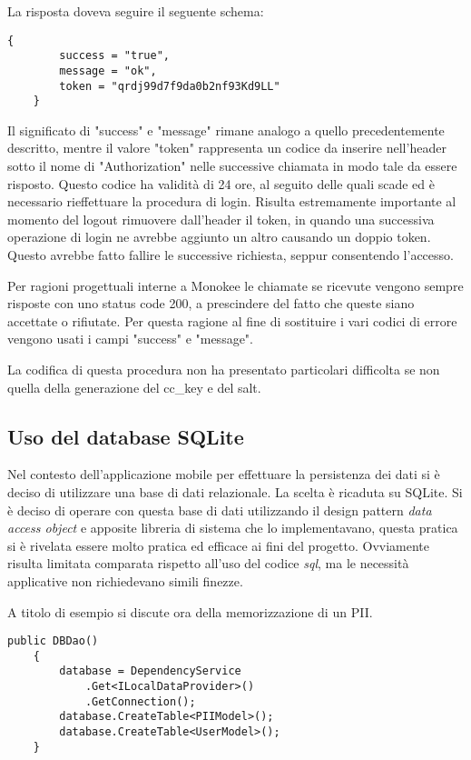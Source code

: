 La risposta doveva seguire il seguente schema:
\begin{lstlisting}[caption={Json risposta token}]
    {
        success = "true",
        message = "ok",
        token = "qrdj99d7f9da0b2nf93Kd9LL"
    }
\end{lstlisting}

Il significato di "success" e "message" rimane analogo a quello precedentemente descritto, mentre il valore "token" rappresenta un codice da inserire nell'header sotto il nome di "Authorization" nelle successive chiamata in modo tale da essere risposto. Questo codice ha validità di 24 ore, al seguito delle quali scade ed è necessario rieffettuare la procedura di login. Risulta estremamente importante al momento del logout rimuovere dall'header il token, in quando una successiva operazione di login ne avrebbe aggiunto un altro causando un doppio token. Questo avrebbe fatto fallire le successive richiesta, seppur consentendo l'accesso.

Per ragioni progettuali interne a Monokee le chiamate se ricevute vengono sempre risposte con uno status code 200, a prescindere del fatto che queste siano accettate o rifiutate. Per questa ragione al fine di sostituire i vari codici di errore vengono usati i campi "success" e "message". 

La codifica di questa procedura non ha presentato particolari difficolta se non quella della generazione del cc\_key e del salt. 

\subsection{Uso del database SQLite}

Nel contesto dell'applicazione mobile per effettuare la persistenza dei dati si è deciso di utilizzare una base di dati relazionale. La scelta è ricaduta su SQLite. Si è deciso di operare con questa base di dati utilizzando il design pattern \emph{data access object} e apposite libreria di sistema che lo implementavano, questa pratica si è rivelata essere molto pratica ed efficace ai fini del progetto. Ovviamente risulta limitata comparata rispetto all'uso del codice \emph{sql}, ma le necessità applicative non richiedevano simili finezze.

A titolo di esempio si discute ora della memorizzazione di un PII.

\begin{lstlisting}[caption={codice creazione DAO}]
    public DBDao()
    {
        database = DependencyService
            .Get<ILocalDataProvider>()
            .GetConnection();
        database.CreateTable<PIIModel>();
        database.CreateTable<UserModel>();
    }
\end{lstlisting}

